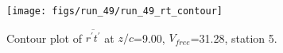 \begin{figure}[H]
\centering
\texttt{[image: figs/run\_49/run\_49\_rt\_contour]}
\caption{Contour plot of $\overline{r^\prime t^\prime}$ at $z/c$=9.00, $V_{free}$=31.28, station 5.}
\end{figure}


